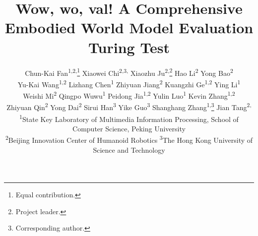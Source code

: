 \documentclass[10pt,twocolumn,letterpaper]{article}
\title{Wow, wo, val! A Comprehensive Embodied World Model Evaluation Turing Test}
\author{
Chun-Kai Fan\textsuperscript{1,2,}\thanks{Equal contribution.}\quad
Xiaowei Chi\textsuperscript{2,3,}\footnotemark[1]\quad
Xiaozhu Ju\textsuperscript{2,}\thanks{Project leader.}\quad
Hao Li\textsuperscript{2}\quad
Yong Bao\textsuperscript{2}\\
Yu-Kai Wang\textsuperscript{1,2}\quad
Lizhang Chen\textsuperscript{1}\quad
Zhiyuan Jiang\textsuperscript{2}\quad
Kuangzhi Ge\textsuperscript{1,2}\quad
Ying Li\textsuperscript{1}\\
Weishi Mi\textsuperscript{2}\quad
Qingpo Wuwu\textsuperscript{1}\quad
Peidong Jia\textsuperscript{1,2}\quad
Yulin Luo\textsuperscript{1}\quad
Kevin Zhang\textsuperscript{1,2}\\
Zhiyuan Qin\textsuperscript{2}\quad
Yong Dai\textsuperscript{2}\quad
Sirui Han\textsuperscript{3}\quad
Yike Guo\textsuperscript{3}\quad
Shanghang Zhang\textsuperscript{1,}\thanks{Corresponding author.}\quad
Jian Tang\textsuperscript{2,}\footnotemark[3] 
\\
\small
\textsuperscript{1}State Key Laboratory of Multimedia Information Processing, School of Computer Science, Peking University\\
\small
\textsuperscript{2}Beijing Innovation Center of Humanoid Robotics\qquad
\small
\textsuperscript{3}The Hong Kong University of Science and Technology
}
\begin{document}
\maketitle






{
    \small
    
    
}

% 
\end{document}
